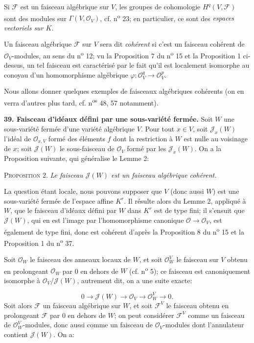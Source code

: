 Si $\mathcal{F}$ est un faisceau algébrique sur $V$, les groupes de cohomologie $H^q(V, \mathcal{F})$ sont des modules sur $\Gamma(V, \mathcal{O}_V)$, cf. n\textsuperscript{o} 23; en particulier, ce sont des \textit{espaces vectoriels sur $K$}.

Un faisceau algébrique $\mathcal{F}$ sur $V$ sera dit \textit{cohérent} si c'est un faisceau cohérent de $\mathcal{O}_V$-modules, au sens du n\textsuperscript{o} 12; vu la Proposition 7 du n\textsuperscript{o} 15 et la Proposition 1 ci-dessus, un tel faisceau est caractérisé par le fait qu'il est localement isomorphe au conoyau d'un homomorphisme algébrique $\varphi : \mathcal{O}_V^q \to \mathcal{O}_V^p$.

Nous allons donner quelques exemples de faisceaux algébriques cohérents (on en verra d'autres plus tard, cf. n\textsuperscript{os} 48, 57 notamment).

\textbf{39. Faisceau d'idéaux défini par une sous-variété fermée.} Soit $W$ une sous-variété fermée d'une variété algébrique $V$. Pour tout $x \in V$, soit $\mathcal{J}_x(W)$ l'idéal de $\mathcal{O}_{x,V}$ formé des éléments $f$ dont la restriction à $W$ est nulle au voisinage de $x$; soit $\mathcal{J}(W)$ le sous-faisceau de $\mathcal{O}_V$ formé par les $\mathcal{J}_x(W)$. On a la Proposition suivante, qui généralise le Lemme 2:

\textsc{Proposition} 2. \textit{Le faisceau $\mathcal{J}(W)$ est un faisceau algébrique cohérent.}

La question étant locale, nous pouvons supposer que $V$ (donc aussi $W$) est une sous-variété fermée de l'espace affine $K^r$. Il résulte alors du Lemme 2, appliqué à $W$, que le faisceau d'idéaux défini par $W$ dans $K^r$ est de type fini; il s'ensuit que $\mathcal{J}(W)$, qui en est l'image par l'homomorphisme canonique $\mathcal{O} \to \mathcal{O}_V$, est également de type fini, donc est cohérent d'après la Proposition 8 du n\textsuperscript{o} 15 et la Proposition 1 du n\textsuperscript{o} 37.



Soit $\mathcal{O}_W$ le faisceau des anneaux locaux de $W$, et soit $\mathcal{O}_W^V$ le faisceau sur $V$ obtenu en prolongeant $\mathcal{O}_W$ par 0 en dehors de $W$ (cf. n\textsuperscript{o} 5); ce faisceau est canoniquement isomorphe à $\mathcal{O}_V/\mathcal{J}(W)$, autrement dit, on a une suite exacte:

\begin{equation*}
0 \to \mathcal{J}(W) \to \mathcal{O}_V \to \mathcal{O}_W^V \to 0.
\end{equation*}
Soit alors $\mathcal{F}$ un faisceau algébrique sur $W$, et soit $\mathcal{F}^V$ le faisceau obtenu en prolongeant $\mathcal{F}$ par 0 en dehors de $W$; on peut considérer $\mathcal{F}^V$ comme un faisceau de $\mathcal{O}_W^V$-modules, donc aussi comme un faisceau de $\mathcal{O}_V$-modules dont l'annulateur contient $\mathcal{J}(W)$. On a:

